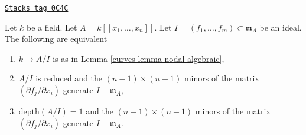 \begin{lemma}
\label{curves-lemma-fitting-ideal}
\href{https://stacks.math.columbia.edu/tag/0C4C}{\texttt{Stacks tag 0C4C}}

Let $k$ be a field. Let $A = k[[x_1, \ldots, x_n]]$. Let
$I = (f_1, \ldots, f_m) \subset \mathfrak m_A$ be an ideal. The following
are equivalent
\begin{enumerate}
\item $k \to A/I$ is as in Lemma \ref{curves-lemma-nodal-algebraic},
\item $A/I$ is reduced and the
$(n - 1) \times (n - 1)$ minors of the matrix
$(\partial f_j/\partial x_i)$ generate $I + \mathfrak m_A$,
\item $\text{depth}(A/I) = 1$ and the
$(n - 1) \times (n - 1)$ minors of the matrix
$(\partial f_j/\partial x_i)$ generate $I + \mathfrak m_A$.
\end{enumerate}
\end{lemma}

